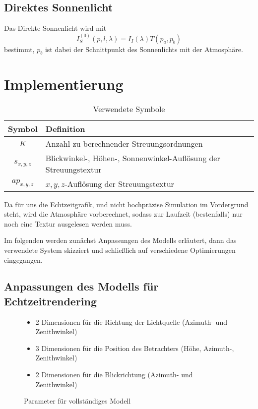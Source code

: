 \subsection{Direktes Sonnenlicht}
Das Direkte Sonnenlicht wird mit
\begin{equation*}
	I^{(0)}_S(p,l,\lambda) = I_I(\lambda)T(p_a, p_b)
\end{equation*}
bestimmt, $p_b$ ist dabei der Schnittpunkt des Sonnenlichts mit der Atmosphäre.

\section{Implementierung}

\begin{table}[h]
	\centering
	\begin{tabular}{| c | p{15em} |}
	\hline
	Symbol & Definition \\ \hline
	$K$ & Anzahl zu berechnender Streuungsordnungen\\
	$s_{x,y,z}$ & Blickwinkel-, Höhen-, Sonnenwinkel-Auflösung der Streuungstextur\\
	$ap_{x,y,z}$ & $x,y,z$-Auflösung der Streuungstextur\\ \hline
	\end{tabular}
	\caption{Verwendete Symbole}
	\label{symbols}
\end{table}

Da für uns die Echtzeitgrafik, und nicht hochpräzise Simulation im Vordergrund steht, wird die Atmosphäre vorberechnet,
sodass zur Laufzeit (bestenfalls) nur noch eine Textur ausgelesen werden muss.

Im folgenden werden zunächst Anpassungen des Modells erläutert, dann das verwendete System skizziert und schließlich auf
verschiedene Optimierungen eingegangen.

\subsection{Anpassungen des Modells für Echtzeitrendering}
\begin{figure}[h]
\begin{mdframed}
\begin{itemize}
\item 2 Dimensionen für die Richtung der Lichtquelle (Azimuth- und Zenithwinkel)
\item 3 Dimensionen für die Position des Betrachters (Höhe, Azimuth-, Zenithwinkel)
\item 2 Dimensionen für die Blickrichtung (Azimuth- und Zenithwinkel)
\end{itemize}
\end{mdframed}
\caption{Parameter für vollständiges Modell}
\label{params:full}
\end{figure}

